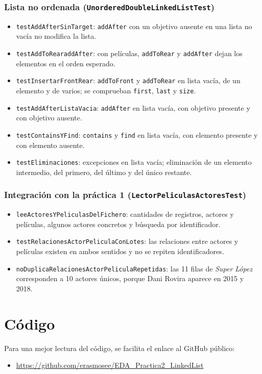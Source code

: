 \documentclass[a4paper,11pt]{report}
\begin{document}
\subsection*{Lista no ordenada (\texttt{UnorderedDoubleLinkedListTest})}
\begin{itemize}
\item \texttt{testAddAfterSinTarget}: \texttt{addAfter} con un objetivo ausente en una lista no vacía no modifica la lista.
\item \texttt{testAddToRearaddAfter}: con películas, \texttt{addToRear} y \texttt{addAfter} dejan los elementos en el orden esperado.
\item \texttt{testInsertarFrontRear}: \texttt{addToFront} y \texttt{addToRear} en lista vacía, de un elemento y de varios; se comprueban \texttt{first}, \texttt{last} y \texttt{size}.
\item \texttt{testAddAfterListaVacia}: \texttt{addAfter} en lista vacía, con objetivo presente y con objetivo ausente.
\item \texttt{testContainsYFind}: \texttt{contains} y \texttt{find} en lista vacía, con elemento presente y con elemento ausente.
\item \texttt{testEliminaciones}: excepciones en lista vacía; eliminación de un elemento intermedio, del primero, del último y del único restante.
\end{itemize}

\subsection*{Integración con la práctica 1 (\texttt{LectorPeliculasActoresTest})}
\begin{itemize}
\item \texttt{leeActoresYPeliculasDelFichero}: cantidades de registros, actores y películas, algunos actores concretos y búsqueda por identificador.
\item \texttt{testRelacionesActorPeliculaConLotes}: las relaciones entre actores y películas existen en ambos sentidos y no se repiten identificadores.
\item \texttt{noDuplicaRelacionesActorPeliculaRepetidas}: las 11 filas de \textit{Super López} corresponden a 10 actores únicos, porque Dani Rovira aparece en 2015 y 2018.
\end{itemize}

\chapter{Código}
Para una mejor lectura del código, se facilita el enlace al GitHub público:
\begin{itemize}
\item \url{https://github.com/erasmosee/EDA_Practica2_LinkedList}
\end{itemize}
\end{document}
